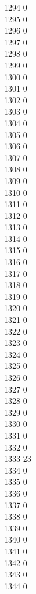 { 1294	0 \\
 1295	0 \\
 1296	0 \\
 1297	0 \\
 1298	0 \\
 1299	0 \\
 1300	0 \\
 1301	0 \\
 1302	0 \\
 1303	0 \\
 1304	0 \\
 1305	0 \\
 1306	0 \\
 1307	0 \\
 1308	0 \\
 1309	0 \\
 1310	0 \\
 1311	0 \\
 1312	0 \\
 1313	0 \\
 1314	0 \\
 1315	0 \\
 1316	0 \\
 1317	0 \\
 1318	0 \\
 1319	0 \\
 1320	0 \\
 1321	0 \\
 1322	0 \\
 1323	0 \\
 1324	0 \\
 1325	0 \\
 1326	0 \\
 1327	0 \\
 1328	0 \\
 1329	0 \\
 1330	0 \\
 1331	0 \\
 1332	0 \\
 1333	23 \\
 1334	0 \\
 1335	0 \\
 1336	0 \\
 1337	0 \\
 1338	0 \\
 1339	0 \\
 1340	0 \\
 1341	0 \\
 1342	0 \\
 1343	0 \\
 1344	0 \\
}
